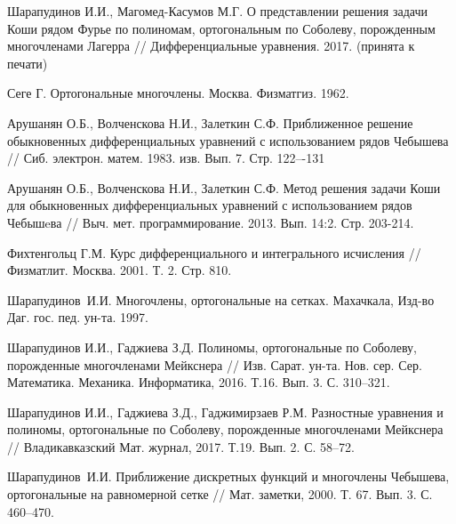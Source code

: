 \begin{thebibliography}{20}
{Шарапудинов И.И., Магомед-Касумов М.Г.}
О представлении решения задачи Коши  рядом Фурье  по полиномам, ортогональным по  Соболеву, порожденным многочленами Лагерра // Дифференциальные уравнения. 2017. (принята к печати)









Сеге Г. Ортогональные многочлены. Москва. Физматгиз. 1962.



{Арушанян О.Б., Волченскова Н.И., Залеткин С.Ф.}
Приближенное решение обыкновенных дифференциальных уравнений с использованием рядов Чебышева // Сиб. электрон. матем. 1983. изв. Вып. 7. Стр. 122–-131



{Арушанян О.Б., Волченскова Н.И., Залеткин С.Ф.}
Метод решения задачи Коши для обыкновенных дифференциальных уравнений с использованием рядов Чебышeва // Выч. мет. программирование. 2013. Вып. 14:2. Стр. 203-214.



{Фихтенгольц Г.М.}
Курс дифференциального и интегрального исчисления // Физматлит. Москва. 2001. Т. 2. Стр. 810.



{Шарапудинов~И.И.} Многочлены, ортогональные на сетках. Махачкала, Изд-во Даг. гос. пед. ун-та. 1997.		



{Шарапудинов И.И., Гаджиева З.Д.}
Полиномы, ортогональные по Соболеву, порожденные многочленами Мейкснера // Изв. Сарат. ун-та. Нов. сер. Сер. Математика. Механика. Информатика,
2016. Т.16. Вып. 3. С. 310--321.



{Шарапудинов И.И., Гаджиева З.Д., Гаджимирзаев Р.М.}
Разностные уравнения и полиномы, ортогональные по Соболеву, порожденные многочленами Мейкснера //
Владикавказский Мат. журнал, 2017. Т.19. Вып. 2. С. 58--72.



{Шарапудинов~И.И.}
Приближение дискретных функций и многочлены Чебышева, ортогональные на равномерной сетке //
Мат. заметки, 2000. Т. 67. Вып. 3. С. 460--470.




\end{thebibliography}
